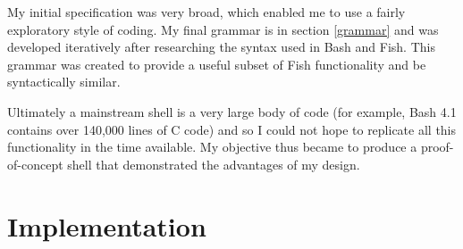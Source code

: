 \documentclass[12pt,twoside,notitlepage]{report}
\begin{document}
My initial specification was very broad, which enabled me to use a
fairly exploratory style of coding. My final grammar is in section
\ref{grammar} and was developed iteratively after researching the
syntax used in Bash and Fish. This grammar was created to provide a
useful subset of Fish functionality and be syntactically similar.

Ultimately a mainstream shell is a very large body of code (for
example, Bash 4.1 contains over 140,000 lines of C
code\footnotemark[1]) and so I could not hope to replicate all this
functionality in the time available. My objective thus became to
produce a proof-of-concept shell that demonstrated the advantages of
my design.







\cleardoublepage

\chapter{Implementation}
\end{document}
